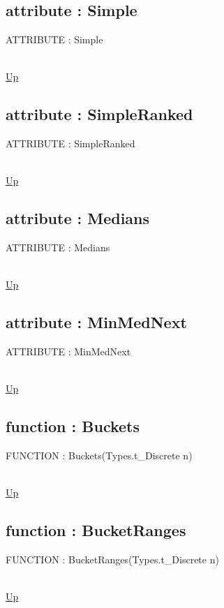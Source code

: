 \subsection*{attribute : Simple}
\hypertarget{ecldoc:ml_core.fieldaggregates.simple}{ATTRIBUTE : Simple} \\
\hyperlink{ecldoc:ml_core.fieldaggregates}{Up} \\
\par
\subsection*{attribute : SimpleRanked}
\hypertarget{ecldoc:ml_core.fieldaggregates.simpleranked}{ATTRIBUTE : SimpleRanked} \\
\hyperlink{ecldoc:ml_core.fieldaggregates}{Up} \\
\par
\subsection*{attribute : Medians}
\hypertarget{ecldoc:ml_core.fieldaggregates.medians}{ATTRIBUTE : Medians} \\
\hyperlink{ecldoc:ml_core.fieldaggregates}{Up} \\
\par
\subsection*{attribute : MinMedNext}
\hypertarget{ecldoc:ml_core.fieldaggregates.minmednext}{ATTRIBUTE : MinMedNext} \\
\hyperlink{ecldoc:ml_core.fieldaggregates}{Up} \\
\par
\subsection*{function : Buckets}
\hypertarget{ecldoc:ml_core.fieldaggregates.buckets}{FUNCTION : Buckets(Types.t\_Discrete n)} \\
\hyperlink{ecldoc:ml_core.fieldaggregates}{Up} \\
\par
\subsection*{function : BucketRanges}
\hypertarget{ecldoc:ml_core.fieldaggregates.bucketranges}{FUNCTION : BucketRanges(Types.t\_Discrete n)} \\
\hyperlink{ecldoc:ml_core.fieldaggregates}{Up} \\
\par

